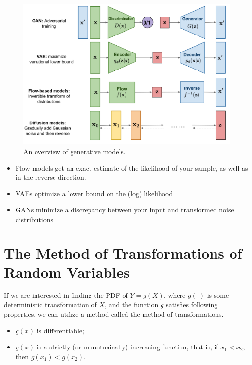 
\begin{figure}[h]
	\centering
	\includegraphics[scale=0.53]{./images/generative/flows/generative_models.png}
	\caption{An overview of generative models.}
\end{figure}

\begin{itemize}
	\item Flow-models get an exact estimate of the likelihood of your sample, as well as in the reverse direction. 
	\item VAEs optimize a lower bound on the (log) likelihood 
	\item GANs minimize a discrepancy between your input and transformed noise distributions. 
\end{itemize}



\section{The Method of Transformations of Random Variables}

If we are interested in finding the PDF of $Y=g(X)$, where $g(\cdot)$ is some deterministic transformation of $X$, and the function $g$ satisfies following properties, we can utilize a method called the method of transformations.
\begin{itemize}
	\item $g(x)$ is differentiable;
	\item $g(x)$ is a strictly (or monotonically) increasing function, that is, if $x_1<x_2$, then $g(x_1)<g(x_2)$.
\end{itemize}


